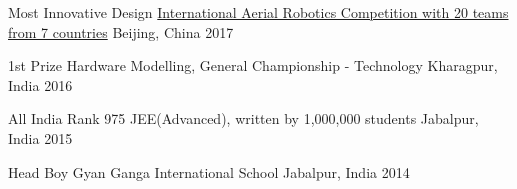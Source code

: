 


\begin{cvhonors}

  \cvhonor
    {Most Innovative Design} %
    {\href{http://www.aerialroboticscompetition.org/}{International Aerial Robotics Competition with 20 teams from 7 countries}} %
    {Beijing, China} %
    {2017} %


  \cvhonor
    {1st Prize} %
    {Hardware Modelling, General Championship - Technology} %
    {Kharagpur, India} %
    {2016} %

  \cvhonor
    {All India Rank 975} %
    {JEE(Advanced), written by 1,000,000 students} %
    {Jabalpur, India} %
    {2015} %
    
    \cvhonor
    {Head Boy} %
    {Gyan Ganga International School} %
    {Jabalpur, India} %
    {2014} %

\end{cvhonors}


